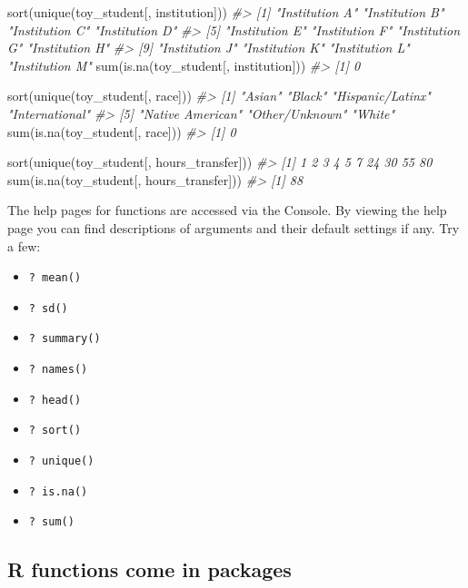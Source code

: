 \documentclass[
]{book}
\newenvironment{Shaded}{\begin{snugshade}}{\end{snugshade}}
\newcommand{\CommentTok}[1]{\textcolor[rgb]{0.56,0.35,0.01}{\textit{#1}}}
\newcommand{\FunctionTok}[1]{\textcolor[rgb]{0.00,0.00,0.00}{#1}}
\newcommand{\NormalTok}[1]{#1}
\providecommand{\tightlist}{%
  \setlength{\itemsep}{0pt}\setlength{\parskip}{0pt}}
\begin{document}
\begin{Shaded}
\begin{Highlighting}[]
\FunctionTok{sort}\NormalTok{(}\FunctionTok{unique}\NormalTok{(toy\_student[, institution]))}
\CommentTok{\#\textgreater{}  [1] "Institution A" "Institution B" "Institution C" "Institution D"}
\CommentTok{\#\textgreater{}  [5] "Institution E" "Institution F" "Institution G" "Institution H"}
\CommentTok{\#\textgreater{}  [9] "Institution J" "Institution K" "Institution L" "Institution M"}
\FunctionTok{sum}\NormalTok{(}\FunctionTok{is.na}\NormalTok{(toy\_student[, institution]))}
\CommentTok{\#\textgreater{} [1] 0}

\FunctionTok{sort}\NormalTok{(}\FunctionTok{unique}\NormalTok{(toy\_student[, race]))}
\CommentTok{\#\textgreater{} [1] "Asian"           "Black"           "Hispanic/Latinx" "International"  }
\CommentTok{\#\textgreater{} [5] "Native American" "Other/Unknown"   "White"}
\FunctionTok{sum}\NormalTok{(}\FunctionTok{is.na}\NormalTok{(toy\_student[, race]))}
\CommentTok{\#\textgreater{} [1] 0}

\FunctionTok{sort}\NormalTok{(}\FunctionTok{unique}\NormalTok{(toy\_student[, hours\_transfer]))}
\CommentTok{\#\textgreater{}  [1]  1  2  3  4  5  7 24 30 55 80}
\FunctionTok{sum}\NormalTok{(}\FunctionTok{is.na}\NormalTok{(toy\_student[, hours\_transfer]))}
\CommentTok{\#\textgreater{} [1] 88}
\end{Highlighting}
\end{Shaded}

The help pages for functions are accessed via the Console. By viewing the help page you can find descriptions of arguments and their default settings if any. Try a few:

\begin{itemize}
\tightlist
\item
  \texttt{?\ mean()}
\item
  \texttt{?\ sd()}
\item
  \texttt{?\ summary()}
\item
  \texttt{?\ names()}
\item
  \texttt{?\ head()}
\item
  \texttt{?\ sort()}
\item
  \texttt{?\ unique()}
\item
  \texttt{?\ is.na()}
\item
  \texttt{?\ sum()}
\end{itemize}

\hypertarget{r-functions-come-in-packages}{%
\subsection{R functions come in packages}\label{r-functions-come-in-packages}}
\end{document}
